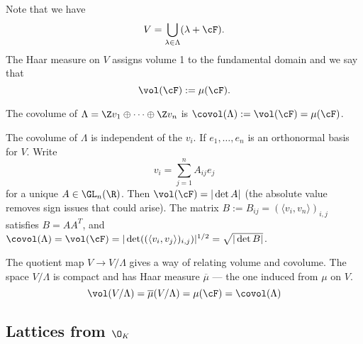 Note that we have
	\[
	V= \bigcup_{\lambda \in \Lambda} (\lambda + \cF).
	\]
The Haar measure on $V$ assigns volume 1 to the fundamental domain and we say that
	\[
	\vol(\cF):= \mu(\cF).
	\]

\begin{dfn}[Covolume]
The covolume of $\Lambda= \Z v_1 \oplus \cdots \oplus \Z v_n$ is $\covol(\Lambda):= \vol(\cF)=\mu(\cF)$.
\end{dfn}

The covolume of $\Lambda$ is independent of the $v_i$. If $e_1,\ldots,e_n$ is an orthonormal basis for $V$. Write
	\[
	v_i= \sum_{j=1}^n A_{ij} e_j
	\]
for a unique $A \in \GL_n(\R)$. Then $\vol(\cF)=|\det A|$ (the absolute value removes sign issues that could arise). The matrix $B:=B_{ij}= (\langle v_i,v_n \rangle)_{i,j}$ satisfies $B=AA^T$, and $\covol(\Lambda)=\vol(\cF)=|\det((\langle v_i,v_j \rangle)_{i,j})|^{1/2}=\sqrt{|\det B|}$. 


\begin{rem}
The quotient map $V \to V/\Lambda$ gives a way of relating volume and covolume. The space $V/\Lambda$ is compact and has Haar measure $\overline{\mu}$ --- the one induced from $\mu$ on $V$.
	\[
	\vol(V/\Lambda)= \overline{\mu}(V/\Lambda)=\mu(\cF)=\covol(\Lambda)
	\]
\end{rem}



\subsection{Lattices from $\O_K$}

